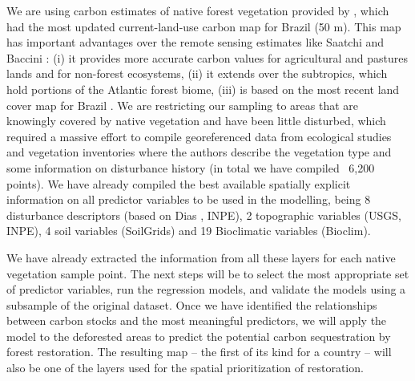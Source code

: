 We are using carbon estimates of native forest vegetation provided by \cite{Englund2017}, which had the most updated current-land-use carbon map for Brazil (50 m). This map has important advantages over the remote sensing estimates like Saatchi \cite{SaatchiSSHarrisNLBrownSLefskyMMitchardETSalasWZuttaBRBuermannWLewisSLHagenSPetrovaSWhiteLSilmanM2011BenchmarkContinents}  and Baccini \cite{Baccini2012}: (i) it provides more accurate carbon values for agricultural and pastures lands and for non-forest ecosystems, (ii) it extends over the subtropics, which hold portions of the Atlantic forest biome, (iii) is based on the most recent land cover map for Brazil \citep{Sparovek2015}. We are restricting our sampling to areas that are knowingly covered by native vegetation and have been little disturbed, which required a massive effort to compile georeferenced data from ecological studies and vegetation inventories where the authors describe the vegetation type and some information on disturbance history (in total we have compiled ~6,200 points). We have already compiled the best available spatially explicit information on all predictor variables to be used in the modelling, being 8 disturbance descriptors (based on Dias \cite{Dias2016a}, INPE), 2 topographic variables (USGS, INPE), 4 soil variables (SoilGrids) and 19 Bioclimatic variables (Bioclim).

We have already extracted the information from all these layers for each native vegetation sample point. The next steps will be to select the most appropriate set of predictor variables, run the regression models, and validate the models using a subsample of the original dataset. Once we have identified the relationships between carbon stocks and the most meaningful predictors, we will apply the model to the deforested areas to predict the potential carbon sequestration by forest restoration. The resulting map – the first of its kind for a country – will also be one of the layers used for the spatial prioritization of restoration. 


